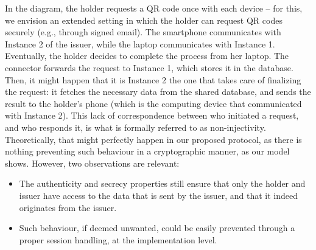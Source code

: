 \documentclass[10pt,a4paper]{article}
\begin{document}
In the diagram, the holder requests a QR code once with each device -- for this,
we envision an extended setting in which the holder can request QR codes
securely (e.g., through signed email). The smartphone communicates with Instance
2 of the issuer, while the laptop communicates with Instance 1. Eventually, the
holder decides to complete the process from her laptop. The connector forwards
the request to Instance 1, which stores it in the database. Then, it might
happen that it is Instance 2 the one that takes care of finalizing the request:
it fetches the necessary data from the shared database, and sends the result to
the holder's phone (which is the computing device that communicated with
Instance 2). This lack of correspondence between who initiated a request, and
who responds it, is what is formally referred to as non-injectivity.
Theoretically, that might perfectly happen in our proposed protocol, as there is
nothing preventing such behaviour in a cryptographic manner, as our model shows.
However, two observations are relevant:

\begin{itemize}
\item The authenticity and secrecy properties still ensure that only the holder
  and issuer have access to the data that is sent by the issuer, and that it
  indeed originates from the issuer.
\item Such behaviour, if deemed unwanted, could be easily prevented through a
  proper session handling, at the implementation level.
\end{itemize}



\end{document}
